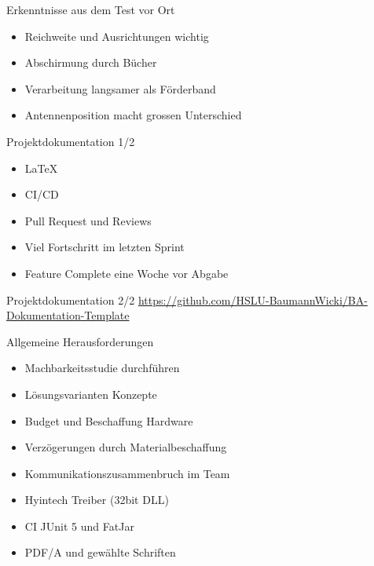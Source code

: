 \documentclass{beamer}
\begin{document}
\begin{frame}{Erkenntnisse aus dem Test vor Ort}
\begin{itemize}
    \item Reichweite und Ausrichtungen wichtig
    \item Abschirmung durch Bücher
    \item Verarbeitung langsamer als Förderband
    \item Antennenposition macht grossen Unterschied
\end{itemize}
\end{frame}
\begin{frame}{Projektdokumentation 1/2}
\begin{itemize}
    \item \LaTeX
    \item CI/CD
    \item Pull Request und Reviews
    \item Viel Fortschritt im letzten Sprint
    \item Feature Complete eine Woche vor Abgabe
\end{itemize}
\end{frame}
\begin{frame}{Projektdokumentation 2/2}
\url{https://github.com/HSLU-BaumannWicki/BA-Dokumentation-Template}
\end{frame}
\begin{frame}{Allgemeine Herausforderungen}
\begin{itemize}
    \item Machbarkeitsstudie durchführen
    \item Lösungsvarianten Konzepte
    \item Budget und Beschaffung Hardware
    \item Verzögerungen durch Materialbeschaffung
    \item Kommunikationszusammenbruch im Team
    \item Hyintech Treiber (32bit DLL)
    \item CI JUnit 5 und FatJar
    \item PDF/A und gewählte Schriften
\end{itemize}
\end{frame}
\end{document}
